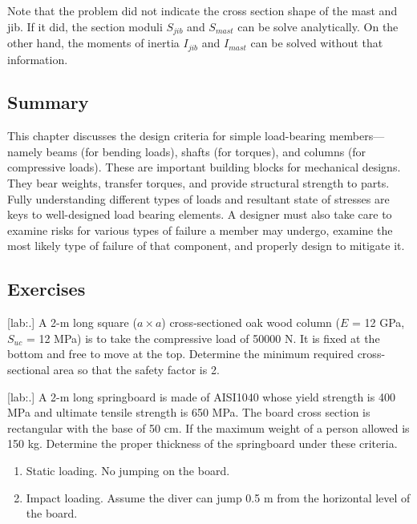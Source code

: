 \documentclass[a4paper,openany,nobib]{tufte-book}
\begin{document}
{{\begin{enumerate}
Note that the problem did not indicate the cross section shape of the
mast and jib. If it did, the section moduli \(S_{jib}\) and \(S_{mast}\) can
be solve analytically. On the other hand, the moments of inertia
\(I_{jib}\) and \(I_{mast}\) can be solved without that information.
\end{enumerate}

\subsection{Summary}
\label{summary-4}
This chapter discusses the design criteria for simple load-bearing
members---namely beams (for bending loads), shafts (for torques), and
columns (for compressive loads). These are important building blocks for
mechanical designs. They bear weights, transfer torques, and provide
structural strength to parts. Fully understanding different types of
loads and resultant state of stresses are keys to well-designed load
bearing elements. A designer must also take care to examine risks for
various types of failure a member may undergo, examine the most likely
type of failure of that component, and properly design to mitigate it.

\subsection{Exercises}
\label{exercises-4}
[lab:.] A 2-m long square
(\(a \times a\)) cross-sectioned oak wood column (\(E\) = 12 GPa, \(S_{uc}\) =
12 MPa) is to take the compressive load of 50000 N. It is fixed at the
bottom and free to move at the top. Determine the minimum required
cross-sectional area so that the safety factor is 2.


[lab:.] A 2-m long springboard is
made of AISI1040 whose yield strength is 400 MPa and ultimate tensile
strength is 650 MPa. The board cross section is rectangular with the
base of 50 cm. If the maximum weight of a person allowed is 150 kg.
Determine the proper thickness of the springboard under these criteria.



\begin{enumerate}
\item Static loading. No jumping on the board.

\item Impact loading. Assume the diver can jump 0.5 m from the horizontal
level of the board.


\end{enumerate}}}
\end{document}
